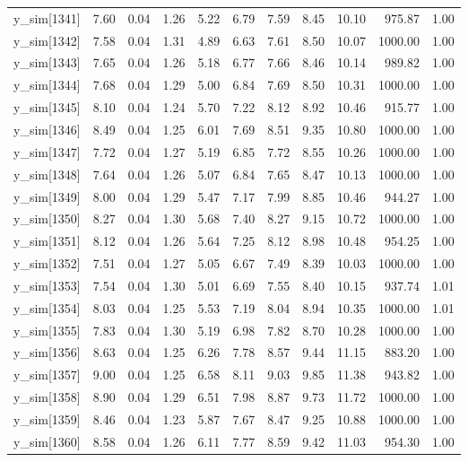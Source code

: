 \begin{table}[ht]
\begin{tabular}{rrrrrrrrrrr}
  y\_sim[1341] & 7.60 & 0.04 & 1.26 & 5.22 & 6.79 & 7.59 & 8.45 & 10.10 & 975.87 & 1.00 \\ 
  y\_sim[1342] & 7.58 & 0.04 & 1.31 & 4.89 & 6.63 & 7.61 & 8.50 & 10.07 & 1000.00 & 1.00 \\ 
  y\_sim[1343] & 7.65 & 0.04 & 1.26 & 5.18 & 6.77 & 7.66 & 8.46 & 10.14 & 989.82 & 1.00 \\ 
  y\_sim[1344] & 7.68 & 0.04 & 1.29 & 5.00 & 6.84 & 7.69 & 8.50 & 10.31 & 1000.00 & 1.00 \\ 
  y\_sim[1345] & 8.10 & 0.04 & 1.24 & 5.70 & 7.22 & 8.12 & 8.92 & 10.46 & 915.77 & 1.00 \\ 
  y\_sim[1346] & 8.49 & 0.04 & 1.25 & 6.01 & 7.69 & 8.51 & 9.35 & 10.80 & 1000.00 & 1.00 \\ 
  y\_sim[1347] & 7.72 & 0.04 & 1.27 & 5.19 & 6.85 & 7.72 & 8.55 & 10.26 & 1000.00 & 1.00 \\ 
  y\_sim[1348] & 7.64 & 0.04 & 1.26 & 5.07 & 6.84 & 7.65 & 8.47 & 10.13 & 1000.00 & 1.00 \\ 
  y\_sim[1349] & 8.00 & 0.04 & 1.29 & 5.47 & 7.17 & 7.99 & 8.85 & 10.46 & 944.27 & 1.00 \\ 
  y\_sim[1350] & 8.27 & 0.04 & 1.30 & 5.68 & 7.40 & 8.27 & 9.15 & 10.72 & 1000.00 & 1.00 \\ 
  y\_sim[1351] & 8.12 & 0.04 & 1.26 & 5.64 & 7.25 & 8.12 & 8.98 & 10.48 & 954.25 & 1.00 \\ 
  y\_sim[1352] & 7.51 & 0.04 & 1.27 & 5.05 & 6.67 & 7.49 & 8.39 & 10.03 & 1000.00 & 1.00 \\ 
  y\_sim[1353] & 7.54 & 0.04 & 1.30 & 5.01 & 6.69 & 7.55 & 8.40 & 10.15 & 937.74 & 1.01 \\ 
  y\_sim[1354] & 8.03 & 0.04 & 1.25 & 5.53 & 7.19 & 8.04 & 8.94 & 10.35 & 1000.00 & 1.01 \\ 
  y\_sim[1355] & 7.83 & 0.04 & 1.30 & 5.19 & 6.98 & 7.82 & 8.70 & 10.28 & 1000.00 & 1.00 \\ 
  y\_sim[1356] & 8.63 & 0.04 & 1.25 & 6.26 & 7.78 & 8.57 & 9.44 & 11.15 & 883.20 & 1.00 \\ 
  y\_sim[1357] & 9.00 & 0.04 & 1.25 & 6.58 & 8.11 & 9.03 & 9.85 & 11.38 & 943.82 & 1.00 \\ 
  y\_sim[1358] & 8.90 & 0.04 & 1.29 & 6.51 & 7.98 & 8.87 & 9.73 & 11.72 & 1000.00 & 1.00 \\ 
  y\_sim[1359] & 8.46 & 0.04 & 1.23 & 5.87 & 7.67 & 8.47 & 9.25 & 10.88 & 1000.00 & 1.00 \\ 
  y\_sim[1360] & 8.58 & 0.04 & 1.26 & 6.11 & 7.77 & 8.59 & 9.42 & 11.03 & 954.30 & 1.00 \\ 

\end{tabular}
\end{table}
